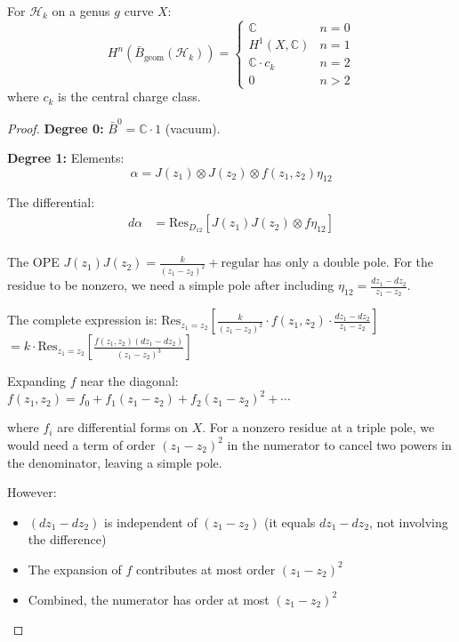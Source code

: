 \begin{theorem}\label{thm:heisenberg-bar}
For $\mathcal{H}_k$ on a genus $g$ curve $X$:
\[
H^n(\bar{B}_{\text{geom}}(\mathcal{H}_k)) = 
\begin{cases}
\mathbb{C} & n = 0 \\
H^1(X, \mathbb{C}) & n = 1 \\
\mathbb{C} \cdot c_k & n = 2 \\
0 & n > 2
\end{cases}
\]
where $c_k$ is the central charge class.
\end{theorem}
 
\begin{proof}
\textbf{Degree 0:} $\bar{B}^0 = \mathbb{C} \cdot 1$ (vacuum).
 
\textbf{Degree 1:} Elements:
\[
\alpha = J(z_1) \otimes J(z_2) \otimes f(z_1,z_2)\eta_{12}
\]
 
The differential:
\begin{align}
d\alpha &= \text{Res}_{D_{12}}\left[J(z_1)J(z_2) \otimes f\eta_{12}\right] \\
\end{align}

The OPE $J(z_1)J(z_2) = \frac{k}{(z_1-z_2)^2} + \text{regular}$ has only a double pole. For the residue to be nonzero, we need a simple pole after including $\eta_{12} = \frac{dz_1 - dz_2}{z_1 - z_2}$.

The complete expression is:
$\text{Res}_{z_1=z_2}\left[\frac{k}{(z_1 - z_2)^2} \cdot f(z_1, z_2) \cdot \frac{dz_1 - dz_2}{z_1 - z_2}\right]$
$= k \cdot \text{Res}_{z_1=z_2}\left[\frac{f(z_1, z_2)(dz_1 - dz_2)}{(z_1 - z_2)^3}\right]$

Expanding $f$ near the diagonal:
$f(z_1, z_2) = f_0 + f_1(z_1 - z_2) + f_2(z_1 - z_2)^2 + \cdots$

where $f_i$ are differential forms on $X$. For a nonzero residue at a triple pole, we would need a term of order $(z_1 - z_2)^2$ in the numerator to cancel two powers in the denominator, leaving a simple pole.

However:
\begin{itemize}
\item $(dz_1 - dz_2)$ is independent of $(z_1 - z_2)$ (it equals $dz_1 - dz_2$, not involving the difference)
\item The expansion of $f$ contributes at most order $(z_1 - z_2)^2$
\item Combined, the numerator has order at most $(z_1 - z_2)^2$
\end{itemize}


\end{proof}
